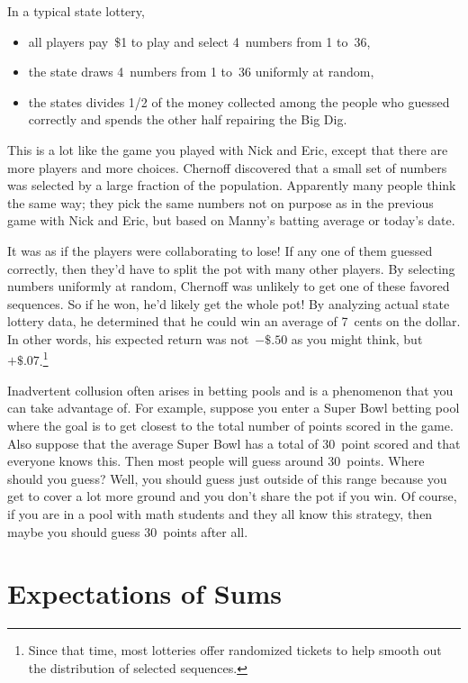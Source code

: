In a typical state lottery,
\begin{itemize}

\item all players pay~\$1 to play and select 4~numbers from 1 to~36,

\item the state draws 4~numbers from 1 to~36 uniformly at random,

\item the states divides 1/2 of the money collected among the people
  who guessed correctly and spends the other half repairing the Big
  Dig.

\end{itemize}
This is a lot like the game you played with Nick and Eric, except that
there are more players and more choices.  Chernoff discovered that a
small set of numbers was selected by a large fraction of the
population.  Apparently many people think the same way; they pick the
same numbers not on purpose as in the previous game with Nick and
Eric, but based on Manny's batting average or today's date.

It was as if the players were collaborating to lose!  If any one of
them guessed correctly, then they'd have to split the pot with many
other players.  By selecting numbers uniformly at random, Chernoff was
unlikely to get one of these favored sequences.  So if he won, he'd
likely get the whole pot!  By analyzing actual state lottery data, he
determined that he could win an average of 7~cents on the dollar.  In
other words, his expected return was not~$-\${.}50$ as you might think,
but~$+\${.}07$.\footnote{Since that time, most lotteries offer
  randomized tickets to help smooth out the distribution of selected
  sequences.}

Inadvertent collusion often arises in betting pools and is a
phenomenon that you can take advantage of.  For example, suppose you
enter a Super Bowl betting pool where the goal is to get closest to
the total number of points scored in the game.  Also suppose that the
average Super Bowl has a total of 30~point scored and that everyone
knows this.  Then most people will guess around 30~points.  Where
should you guess?  Well, you should guess just outside of this range
because you get to cover a lot more ground and you don't share the pot
if you win.  Of course, if you are in a pool with math students and
they all know this strategy, then maybe you should guess 30~points
after all.


\section{Expectations of Sums}

